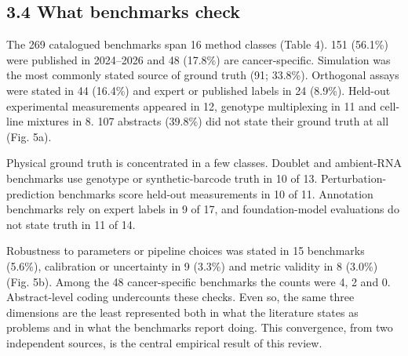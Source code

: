 \documentclass[11pt]{article}
\begin{document}
\subsection{3.4 What benchmarks check}\label{what-benchmarks-check}

The 269 catalogued benchmarks span 16 method classes (Table 4). 151
(56.1\%) were published in 2024--2026 and 48 (17.8\%) are
cancer-specific. Simulation was the most commonly stated source of
ground truth (91; 33.8\%). Orthogonal assays were stated in 44 (16.4\%)
and expert or published labels in 24 (8.9\%). Held-out experimental
measurements appeared in 12, genotype multiplexing in 11 and cell-line
mixtures in 8. 107 abstracts (39.8\%) did not state their ground truth
at all (Fig. 5a).

Physical ground truth is concentrated in a few classes. Doublet and
ambient-RNA benchmarks use genotype or synthetic-barcode truth in 10 of
13. Perturbation-prediction benchmarks score held-out measurements in 10
of 11. Annotation benchmarks rely on expert labels in 9 of 17, and
foundation-model evaluations do not state truth in 11 of 14.

Robustness to parameters or pipeline choices was stated in 15 benchmarks
(5.6\%), calibration or uncertainty in 9 (3.3\%) and metric validity in
8 (3.0\%) (Fig. 5b). Among the 48 cancer-specific benchmarks the counts
were 4, 2 and 0. Abstract-level coding undercounts these checks. Even
so, the same three dimensions are the least represented both in what the
literature states as problems and in what the benchmarks report doing.
This convergence, from two independent sources, is the central empirical
result of this review.
\end{document}
